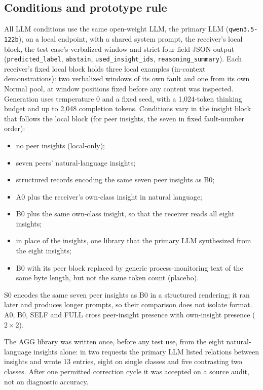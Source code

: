 \documentclass[conference]{IEEEtran}
\newcommand{\cond}[1]{\textsf{#1}}
\begin{document}
\subsection{Conditions and prototype rule}
\label{sec:conditions}
All LLM conditions use the same open-weight LLM, the primary LLM (\texttt{qwen3.5-122b}), on a local endpoint, with a shared system prompt, the receiver's local block, the test case's verbalized window and strict four-field JSON output (\texttt{predicted\_label}, \texttt{abstain}, \texttt{used\_insight\_ids}, \texttt{reasoning\_summary}). Each receiver's fixed local block holds three local examples (in-context demonstrations): two verbalized windows of its own fault and one from its own Normal pool, at window positions fixed before any content was inspected. Generation uses temperature 0 and a fixed seed, with a 1,024-token thinking budget and up to 2,048 completion tokens. Conditions vary in the insight block that follows the local block (for peer insights, the seven in fixed fault-number order):
\begin{itemize}[\IEEEsetlabelwidth{\cond{FULL}}]
\item[\cond{A0}] no peer insights (local-only);
\item[\cond{B0}] seven peers' natural-language insights;
\item[\cond{S0}] structured records encoding the same seven peer insights as \cond{B0};
\item[\cond{SELF}] \cond{A0} plus the receiver's own-class insight in natural language;
\item[\cond{FULL}] \cond{B0} plus the same own-class insight, so that the receiver reads all eight insights;
\item[\cond{AGG}] in place of the insights, one library that the primary LLM synthesized from the eight insights;
\item[\cond{PL0}] \cond{B0} with its peer block replaced by generic process-monitoring text of the same byte length, but not the same token count (placebo).
\end{itemize}
\cond{S0} encodes the same seven peer insights as \cond{B0} in a structured rendering; it ran later and produces longer prompts, so their comparison does not isolate format. \cond{A0}, \cond{B0}, \cond{SELF} and \cond{FULL} cross peer-insight presence with own-insight presence ($2\times2$).

The \cond{AGG} library was written once, before any test use, from the eight natural-language insights alone: in two requests the primary LLM listed relations between insights and wrote 13 entries, eight on single classes and five contrasting two classes. After one permitted correction cycle it was accepted on a source audit, not on diagnostic accuracy.
\end{document}
